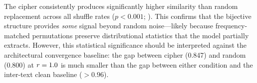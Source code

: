 The cipher consistently produces significantly higher similarity than random replacement across all shuffle rates ($p < 0.001$; ). This confirms that the bijective structure provides \emph{some} signal beyond random noise---likely because frequency-matched permutations preserve distributional statistics that the model partially extracts. However, this statistical significance should be interpreted against the architectural convergence baseline: the gap between cipher (0.847) and random (0.800) at $r = 1.0$ is much smaller than the gap between either condition and the inter-text clean baseline ($>0.96$).
